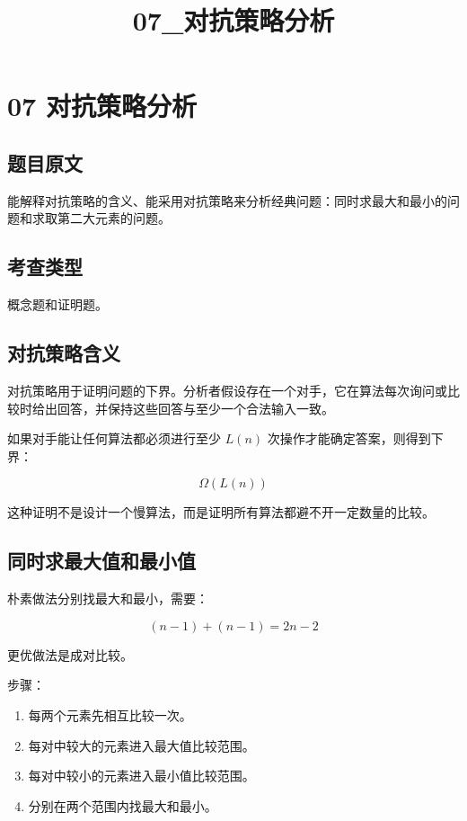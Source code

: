 \documentclass[UTF8,zihao=-4]{ctexart}
\title{07\_对抗策略分析}
\author{}
\date{}
\begin{document}
\maketitle

\section*{07 对抗策略分析}

\subsection*{题目原文}

能解释对抗策略的含义、能采用对抗策略来分析经典问题：同时求最大和最小的问题和求取第二大元素的问题。

\subsection*{考查类型}

概念题和证明题。

\subsection*{对抗策略含义}

对抗策略用于证明问题的下界。分析者假设存在一个对手，它在算法每次询问或比较时给出回答，并保持这些回答与至少一个合法输入一致。

如果对手能让任何算法都必须进行至少 $L(n)$ 次操作才能确定答案，则得到下界：

\[\Omega(L(n))\]

这种证明不是设计一个慢算法，而是证明所有算法都避不开一定数量的比较。

\subsection*{同时求最大值和最小值}

朴素做法分别找最大和最小，需要：

\[(n - 1) + (n - 1) = 2n - 2\]

更优做法是成对比较。

步骤：

\begin{enumerate}
\item 每两个元素先相互比较一次。
\item 每对中较大的元素进入最大值比较范围。
\item 每对中较小的元素进入最小值比较范围。
\item 分别在两个范围内找最大和最小。
\end{enumerate}
\end{document}

